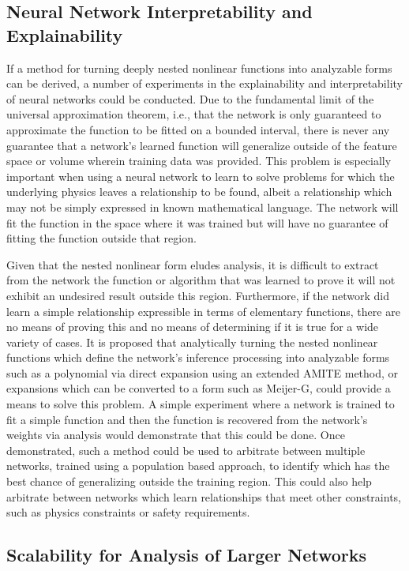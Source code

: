 \subsection{Neural Network Interpretability and Explainability}
If a method for turning deeply nested nonlinear functions into analyzable forms can be derived, a number of experiments in the explainability and interpretability of neural networks could be conducted.  Due to the fundamental limit of the universal approximation theorem, i.e., that the network is only guaranteed to approximate the function to be fitted on a bounded interval, there is never any guarantee that a network's learned function will generalize outside of the feature space or volume wherein training data was provided.  This problem is especially important when using a neural network to learn to solve problems for which the underlying physics leaves a relationship to be found, albeit a relationship which may not be simply expressed in known mathematical language.  The network will fit the function in the space where it was trained but will have no guarantee of fitting the function outside that region.

Given that the nested nonlinear form eludes analysis, it is difficult to extract from the network the function or algorithm that was learned to prove it will not exhibit an undesired result outside this region.  Furthermore, if the network did learn a simple relationship expressible in terms of elementary functions, there are no means of proving this and no means of determining if it is true for a wide variety of cases.  It is proposed that analytically turning the nested nonlinear functions which define the network's inference processing into analyzable forms such as a polynomial via direct expansion using an extended AMITE method, or expansions which can be converted to a form such as Meijer-G, could provide a means to solve this problem.  A simple experiment where a network is trained to fit a simple function and then the function is recovered from the network's weights via analysis would demonstrate that this could be done.  Once demonstrated, such a method could be used to arbitrate between multiple networks, trained using a population based approach, to identify which has the best chance of generalizing outside the training region.  This could also help arbitrate between networks which learn relationships that meet other constraints, such as physics constraints or safety requirements.

\subsection{Scalability for Analysis of Larger Networks}

